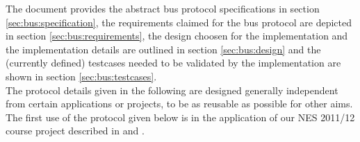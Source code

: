 The document provides the abstract bus protocol specifications in section \ref{sec:bus:specification}, the requirements claimed for the bus protocol are depicted in section \ref{sec:bus:requirements}, the design choosen for the implementation and the implementation details are outlined in section \ref{sec:bus:design} and the (currently defined) testcases needed to be validated by the implementation are shown in section \ref{sec:bus:testcases}.\\

The protocol details given in the following are designed generally independent from certain applications or projects, to be as reusable as possible for other aims. The first use of the protocol given below is in the application of our NES 2011/12 course project described in \cite[NESD1]{NESD1} and \cite[NESD3]{NESD3}.\\
 